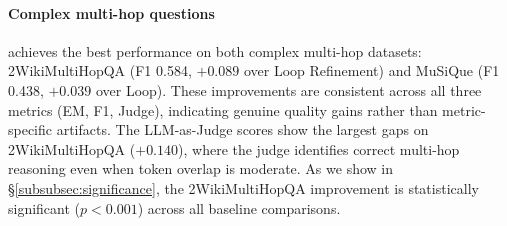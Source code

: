 \begin{table}[t]
\centering
\caption{Main results (RQ1, Gemini Flash Lite). Best result per dataset in \textbf{bold}. $n = 200$ per dataset (FinanceBench: $n = 150$, full dataset). LLM-as-Judge uses gpt-4.1-nano as an independent evaluator.}
\label{tab:rq1_main}
\end{table}

\paragraph{Complex multi-hop questions}
\ours{} achieves the best performance on both complex multi-hop datasets: 2WikiMultiHopQA (F1 0.584, $+0.089$ over Loop Refinement) and MuSiQue (F1 0.438, $+0.039$ over Loop).
These improvements are consistent across all three metrics (EM, F1, Judge), indicating genuine quality gains rather than metric-specific artifacts.
The LLM-as-Judge scores show the largest gaps on 2WikiMultiHopQA ($+0.140$), where the judge identifies correct multi-hop reasoning even when token overlap is moderate.
As we show in \S\ref{subsubsec:significance}, the 2WikiMultiHopQA improvement is statistically significant ($p < 0.001$) across all baseline comparisons.

